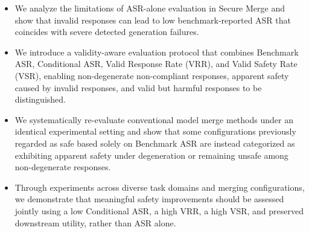 \documentclass{article}
\begin{document}
\begin{itemize}
    \item We analyze the limitations of ASR-alone evaluation in Secure Merge and show that invalid responses can lead to low benchmark-reported ASR that coincides with severe detected generation failures.
    
    \item We introduce a validity-aware evaluation protocol that combines Benchmark ASR, Conditional ASR, Valid Response Rate (VRR), and Valid Safety Rate (VSR), enabling non-degenerate non-compliant responses, apparent safety caused by invalid responses, and valid but harmful responses to be distinguished.
    
    \item We systematically re-evaluate conventional model merge methods under an identical experimental setting and show that some configurations previously regarded as safe based solely on Benchmark ASR are instead categorized as exhibiting apparent safety under degeneration or remaining unsafe among non-degenerate responses.
    
    \item Through experiments across diverse task domains and merging configurations, we demonstrate that meaningful safety improvements should be assessed jointly using a low Conditional ASR, a high VRR, a high VSR, and preserved downstream utility, rather than ASR alone.
\end{itemize}


\end{document}
